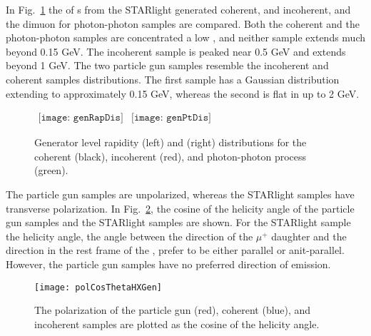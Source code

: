     In Fig.~\ref{fig:starlightRapPtDist} the \pt{} of \JPsi{}s from the 
      STARlight generated coherent, and incoherent, and the dimuon \pt for 
      photon-photon samples are compared.
    Both the coherent and the photon-photon samples are concentrated a low 
      \pt{}, and neither sample extends much beyond 0.15 GeV.
    The incoherent sample is peaked near 0.5 GeV and extends beyond 1 GeV.
    The two particle gun samples resemble the incoherent and coherent samples
      \pt{} distributions.
    The first sample has a Gaussian \pt{} distribution extending to 
      approximately 0.15 GeV, whereas the second is flat in \pt{} up to
      2 GeV.
    \begin{figure}[!Hhbt]
      \centering
      $ \begin{array}{cc}
        \texttt{[image: genRapDis]} &
        \texttt{[image: genPtDis]}
      \end{array} $
      \caption{Generator level rapidity (left) and \pt{} (right) 
          distributions for the coherent (black), incoherent (red), 
          and photon-photon process (green).}
      \label{fig:starlightRapPtDist}
    \end{figure}
    
    The particle gun samples are unpolarized, whereas the STARlight samples 
      have transverse polarization.
    In Fig.~\ref{fig:genHXAngle}, the cosine of the helicity angle of the 
      particle gun samples and the STARlight samples are shown.
    For the STARlight sample the helicity angle, the angle between the 
      direction of the $\mu^{+}$ daughter and the \JPsi{} direction in the rest
      frame of the \JPsi{}, prefer to be either parallel or anit-parallel.
    However, the particle gun samples have no preferred direction of emission.

    \begin{figure}[!Hhbt]
      \centering
      \texttt{[image: polCosThetaHXGen]}
      \caption{ The \JPsi{} polarization of the particle gun (red),
        coherent (blue), and incoherent samples are plotted as the
        cosine of the helicity angle.} 
      \label{fig:genHXAngle}
    \end{figure}
    
